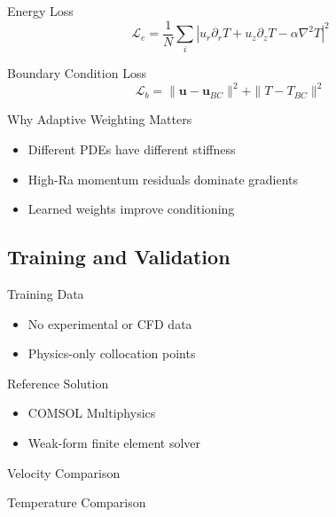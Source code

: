 \documentclass{beamer}
\begin{document}
\begin{frame}{Energy Loss}
\[
\mathcal{L}_e =
\frac{1}{N}\sum_i
\left|
u_r \partial_r T + u_z \partial_z T - \alpha\nabla^2 T
\right|^2
\]
\end{frame}

\begin{frame}{Boundary Condition Loss}
\[
\mathcal{L}_b =
\|\bm{u}-\bm{u}_{BC}\|^2
+ \|T-T_{BC}\|^2
\]
\end{frame}

\begin{frame}{Why Adaptive Weighting Matters}
\begin{itemize}
\item Different PDEs have different stiffness
\item High-Ra momentum residuals dominate gradients
\item Learned weights improve conditioning
\end{itemize}
\end{frame}


\subsection{Training and Validation}

\begin{frame}{Training Data}
\begin{itemize}
\item No experimental or CFD data
\item Physics-only collocation points
\end{itemize}
\end{frame}

\begin{frame}{Reference Solution}
\begin{itemize}
\item COMSOL Multiphysics
\item Weak-form finite element solver
\end{itemize}
\end{frame}

\begin{frame}{Velocity Comparison}
\end{frame}

\begin{frame}{Temperature Comparison}
\end{frame}
\end{document}
